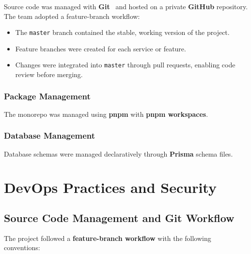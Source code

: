 Source code was managed with \textbf{Git}~\cite{devops2024mslearn} and hosted on a private \textbf{GitHub} repository.
The team adopted a feature-branch workflow:
\begin{itemize}[nosep]
  \item The \texttt{master} branch contained the stable, working version of the project.
  \item Feature branches were created for each service or feature.
  \item Changes were integrated into \texttt{master} through pull requests, enabling code review before merging.
\end{itemize}

\subsubsection{Package Management}

The monorepo was managed using \textbf{pnpm} with \textbf{pnpm workspaces}.

\subsubsection{Database Management}

Database schemas were managed declaratively through \textbf{Prisma} schema files.


\section{DevOps Practices and Security}
\label{sec:devops}

\subsection{Source Code Management and Git Workflow}
\label{sec:git-workflow}

The project followed a \textbf{feature-branch workflow} with the following conventions:

